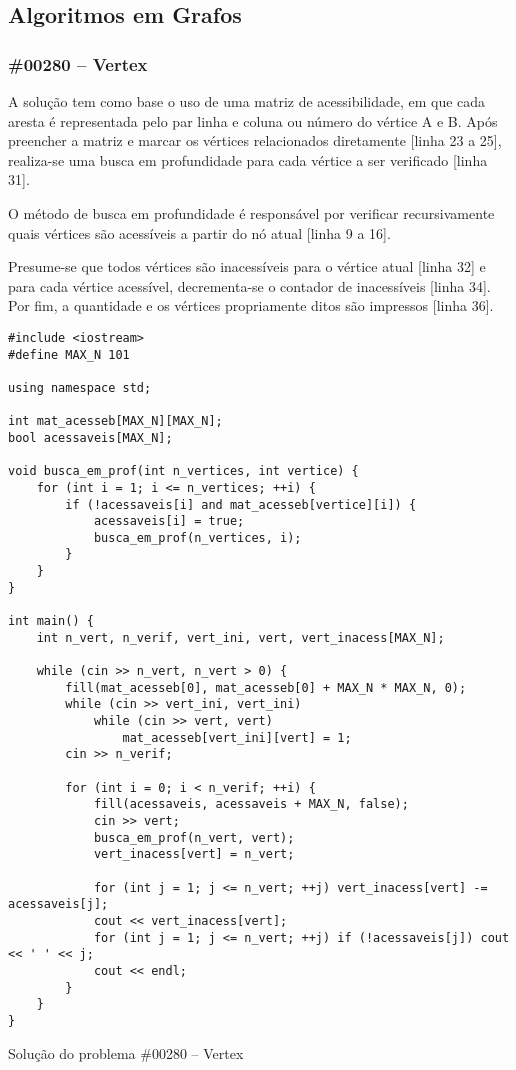 \documentclass[a4paper,12pt]{scrartcl}
\begin{document}
\subsection{Algoritmos em Grafos}

\subsubsection{\#00280 – Vertex}
A solução tem como base o uso de uma matriz de acessibilidade, em que cada aresta é representada pelo par linha e coluna ou número do vértice A e B. Após preencher a matriz e marcar os vértices relacionados diretamente [linha 23 a 25], realiza-se uma busca em profundidade para cada vértice a ser verificado [linha 31].

O método de busca em profundidade é responsável por verificar recursivamente quais vértices são acessíveis a partir do nó atual [linha 9 a 16].

Presume-se que todos vértices são inacessíveis para o vértice atual [linha 32] e para cada vértice acessível, decrementa-se o contador de inacessíveis [linha 34]. Por fim, a quantidade e os vértices propriamente ditos são impressos [linha 36].

\begin{listing}[H]
\begin{verbatim}
#include <iostream>
#define MAX_N 101

using namespace std;

int mat_acesseb[MAX_N][MAX_N];
bool acessaveis[MAX_N];

void busca_em_prof(int n_vertices, int vertice) {
    for (int i = 1; i <= n_vertices; ++i) {
        if (!acessaveis[i] and mat_acesseb[vertice][i]) {
            acessaveis[i] = true;
            busca_em_prof(n_vertices, i);
        }
    }
}

int main() {
    int n_vert, n_verif, vert_ini, vert, vert_inacess[MAX_N];

    while (cin >> n_vert, n_vert > 0) {
        fill(mat_acesseb[0], mat_acesseb[0] + MAX_N * MAX_N, 0);
        while (cin >> vert_ini, vert_ini)
            while (cin >> vert, vert)
                mat_acesseb[vert_ini][vert] = 1;
        cin >> n_verif;

        for (int i = 0; i < n_verif; ++i) {
            fill(acessaveis, acessaveis + MAX_N, false);
            cin >> vert;
            busca_em_prof(n_vert, vert);
            vert_inacess[vert] = n_vert;

            for (int j = 1; j <= n_vert; ++j) vert_inacess[vert] -= acessaveis[j];
            cout << vert_inacess[vert];
            for (int j = 1; j <= n_vert; ++j) if (!acessaveis[j]) cout << ' ' << j;
            cout << endl;
        }
    }
}
\end{verbatim}
\caption{\footnotesize{Solução do problema \#00280 – Vertex}}
\end{listing}
\end{document}
